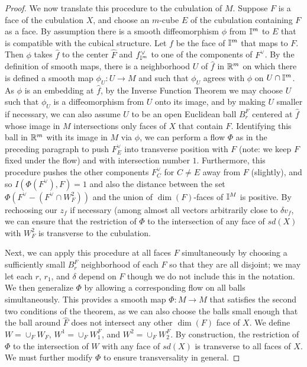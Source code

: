 \begin{proof}
We now translate this procedure to the cubulation of $M$. 
Suppose $F$ is a face of the cubulation $X$, and choose an $m$-cube $E$ of the cubulation containing $F$ as a face. By assumption there is a smooth diffeomorphism $\phi$ from $\mathbb{I}^m$ to $E$ that is compatible with the cubical structure. Let $f$ be the face of $\mathbb{I}^m$ that maps to $F$. Then $\phi$ takes $\hat f$ to the center $\hat F$ and $f^\vee_{\mathbb{I}^m}$ to one of the components of $F^\vee$. By the definition of smooth maps, there is a neighborhood $U$ of $\hat f$ in $\mathbb{R}^m$ on which there is defined a smooth map $\phi_U:U\to M$ and such that $\phi_U$ agrees with $\phi$ on $U\cap \mathbb{I}^m$. As $\phi$ is an embedding at $\hat f$, by the Inverse Function Theorem we may choose $U$ such that $\phi_U$ is a diffeomorphism from $U$ onto its image, and by making $U$ smaller if necessary, we can also assume $U$ to be an open Euclidean ball $B^F_r$ centered at $\hat f$ whose image in $M$ intersections only faces of $X$ that contain $F$. Identifying this ball in $\mathbb{R}^m$ with its image in $M$ via $\phi$, we can perform a flow $\Phi$ as in the preceding paragraph to push $F^\vee_E$ into transverse position with $F$ (note: we keep $F$ fixed under the flow) and with intersection number $1$. Furthermore, this procedure pushes the other components $F^\vee_C$ for $C\neq E$ away from $F$ (slightly), and so $I(\Phi(F^\vee),F)=1$ and also  the distance between the set $\Phi(F^\vee-(F^\vee \cap W^2_F))$ and the union of $\dim(F)$-faces of $\mathbb{I}^M$ is positive. By rechoosing our $z_f$ if necessary (among almost all vectors arbitrarily close to $\delta v_f$, we can ensure that the restriction of $\Phi$ to the intersection of any face of $sd(X)$ with $W^2_F$ is transverse to the cubulation.  

Next, we can apply this procedure at all faces  $F$ simultaneously by choosing a sufficiently small $B^F_r$  neighborhood of each $\hat F$ so that they are all disjoint; we may let each $r$, $r_1$, and $\delta$ depend on $F$ though we do not include this in the notation. We then generalize $\Phi$ by allowing a corresponding flow on all balls simultaneously. This provides a smooth map $\Phi:M\to M$ that satisfies the second two conditions of the theorem, as we can also choose the balls small enough that the ball around $\hat F$ does not intersect any other $\dim(F)$ face of $X$. We define $W=\cup_F W_F$,  $W^1=\cup_F W^F_1$, and  $W^2=\cup_F W^F_2$.  By construction, the restriction of $\Phi$ to the intersection of $W$ with any face of $sd(X)$ is transverse to all faces of $X$.
We must further modify $\Phi$ to ensure transversality in general. 


\end{proof}
